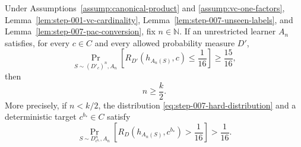 \begin{proposition}
\label{prop:step-007-additive-vc}
Under Assumptions~\ref{assump:canonical-product} and
\ref{assump:vc-one-factors}, Lemma~\ref{lem:step-001-vc-cardinality},
Lemma~\ref{lem:step-007-unseen-labels}, and
Lemma~\ref{lem:step-007-pac-conversion}, fix \(n\in\mathbb N\).  If an
unrestricted learner \(A_n\) satisfies, for every \(c\in C\) and every
allowed probability measure \(D'\),
\begin{equation}\label{eq:step-007-global-pac-premise}
\Pr_{S\sim(D'_c)^n,A_n}
\left[R_{D'}(h_{A_n(S)},c)\le\frac1{16}\right]
\ge\frac{15}{16},
\end{equation}
then
\begin{equation}\label{eq:step-007-additive-lower}
n\ge\frac{k}{2}.
\end{equation}
More precisely, if \(n<k/2\), the distribution
\eqref{eq:step-007-hard-distribution} and a deterministic target
\(c^{b_*}\in C\) satisfy
\begin{equation}\label{eq:step-007-deterministic-failure}
\Pr_{S\sim D_{c^{b_*}}^n,A_n}
\left[R_D(h_{A_n(S)},c^{b_*})>\frac1{16}\right]
>\frac1{16}.
\end{equation}
\end{proposition}

